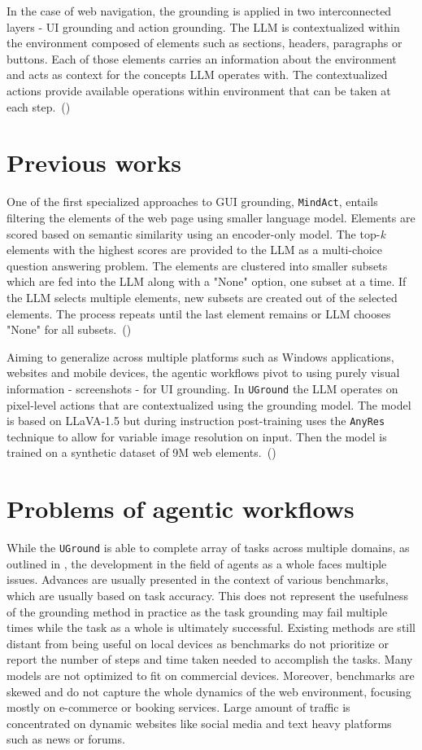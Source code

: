 In the case of web navigation, the grounding is applied in two interconnected layers - UI grounding and action grounding. The LLM is contextualized within the environment composed of elements such as sections, headers, paragraphs or buttons. Each of those elements carries an information about the environment and acts as context for the concepts LLM operates with. The contextualized actions provide available operations within environment that can be taken at each step.~(\cite{deng_mind2web_2023})

\section{Previous works}
One of the first specialized approaches to GUI grounding, \texttt{MindAct}, entails filtering the elements of the web page using smaller language model. Elements are scored based on semantic similarity using an encoder-only model. The top-\textit{k} elements with the highest scores are provided to the LLM as a multi-choice question answering problem. The elements are clustered into smaller subsets which are fed into the LLM along with a "None" option, one subset at a time. If the LLM selects multiple elements, new subsets are created out of the selected elements. The process repeats until the last element remains or LLM chooses "None" for all subsets.~(\cite{deng_mind2web_2023})

Aiming to generalize across multiple platforms such as Windows applications, websites and mobile devices, the agentic workflows pivot to using purely visual information - screenshots - for UI grounding. In \texttt{UGround} the LLM operates on pixel-level actions that are contextualized using the grounding model. The model is based on LLaVA-1.5 but during instruction post-training uses the \texttt{AnyRes} technique to allow for variable image resolution on input. Then the model is trained on a synthetic dataset of 9M web elements.~(\cite{gou_navigating_2025})

\section{Problems of agentic workflows}
While the \texttt{UGround} is able to complete array of tasks across multiple domains, as outlined in \textcite{xue_illusion_2025}, the development in the field of agents as a whole faces multiple issues.
Advances are usually presented in the context of various benchmarks, which are usually based on task accuracy. This does not represent the usefulness of the grounding method in practice as the task grounding may fail multiple times while the task as a whole is ultimately successful.
Existing methods are still distant from being useful on local devices as benchmarks do not prioritize or report the number of steps and time taken needed to accomplish the tasks. Many models are not optimized to fit on commercial devices.
Moreover, benchmarks are skewed and do not capture the whole dynamics of the web environment, focusing mostly on e-commerce or booking services. Large amount of traffic is concentrated on dynamic websites like social media and text heavy platforms such as news or forums.

